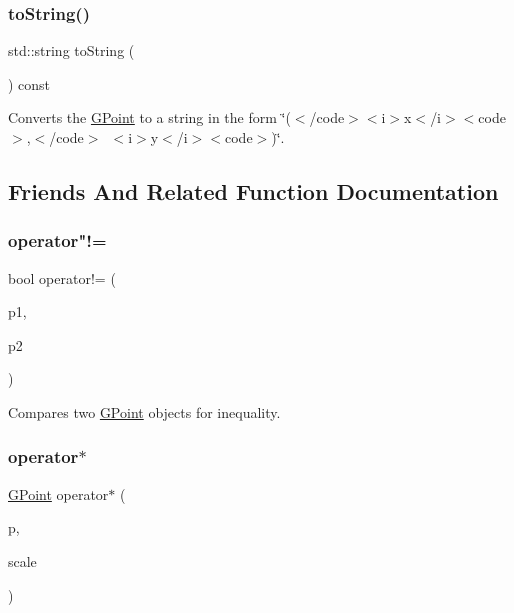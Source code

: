 \subsubsection{\texorpdfstring{to\+String()}{toString()}}
{\footnotesize\ttfamily std\+::string to\+String (\begin{DoxyParamCaption}{ }\end{DoxyParamCaption}) const}



Converts the {\ttfamily \mbox{\hyperlink{structGPoint}{G\+Point}}} to a string in the form {\ttfamily \char`\"{}($<$/code$>$$<$i$>$x$<$/i$>$$<$code$>$,$<$/code$>$~$<$i$>$y$<$/i$>$$<$code$>$)\char`\"{}}. 



\subsection{Friends And Related Function Documentation}
\mbox{\label{structGPoint_add41464e7e2d69b7a90c72b16a7dbc6c}} 
\subsubsection{\texorpdfstring{operator"!=}{operator!=}}
{\footnotesize\ttfamily bool operator!= (\begin{DoxyParamCaption}\item[{const \mbox{\hyperlink{structGPoint}{G\+Point}} \&}]{p1,  }\item[{const \mbox{\hyperlink{structGPoint}{G\+Point}} \&}]{p2 }\end{DoxyParamCaption})\hspace{0.3cm}{\ttfamily [friend]}}



Compares two \mbox{\hyperlink{structGPoint}{G\+Point}} objects for inequality. 

\mbox{\label{structGPoint_a8646a3383f5abfedad724d1e5e6040ef}} 
\subsubsection{\texorpdfstring{operator$\ast$}{operator*}}
{\footnotesize\ttfamily \mbox{\hyperlink{structGPoint}{G\+Point}} operator$\ast$ (\begin{DoxyParamCaption}\item[{const \mbox{\hyperlink{structGPoint}{G\+Point}} \&}]{p,  }\item[{double}]{scale }\end{DoxyParamCaption})\hspace{0.3cm}{\ttfamily [friend]}}



